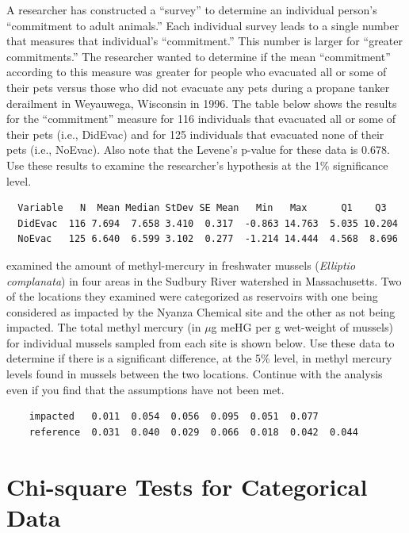 \documentclass[10pt,openany]{book}\usepackage[]{graphicx}\usepackage[]{color}
\begin{document}
\begin{hwsection}
  \item \label{hwprob:tTestCommitment} A researcher has constructed a ``survey'' to determine an individual person's ``commitment to adult animals.''  Each individual survey leads to a single number that measures that individual's ``commitment.''  This number is larger for ``greater commitments.''  The researcher wanted to determine if the mean ``commitment'' according to this measure was greater for people who evacuated all or some of their pets versus those who did not evacuate any pets during a propane tanker derailment in Weyauwega, Wisconsin in 1996.  The table below shows the results for the ``commitment'' measure for 116 individuals that evacuated all or some of their pets (i.e., DidEvac) and for 125 individuals that evacuated none of their pets (i.e., NoEvac).  Also note that the Levene's p-value for these data is 0.678.  Use these results to examine the researcher's hypothesis at the 1\% significance level.

  \begin{Verbatim}
  Variable   N  Mean Median StDev SE Mean   Min   Max      Q1    Q3
  DidEvac  116 7.694  7.658 3.410  0.317  -0.863 14.763  5.035 10.204
  NoEvac   125 6.640  6.599 3.102  0.277  -1.214 14.444  4.568  8.696
  \end{Verbatim}

  \item \label{hwprob:tTestMussels} \rhw{} \cite{MierzykowskiCarr2001} examined the amount of methyl-mercury in freshwater mussels (\emph{Elliptio complanata}) in four areas in the Sudbury River watershed in Massachusetts.  Two of the locations they examined were categorized as reservoirs with one being considered as impacted by the Nyanza Chemical site and the other as not being impacted.  The total methyl mercury (in $\mu$g meHG per g wet-weight of mussels) for individual mussels sampled from each site is shown below.  Use these data to determine if there is a significant difference, at the 5\% level, in methyl mercury levels found in mussels between the two locations.  Continue with the analysis even if you find that the assumptions have not been met.

  \begin{Verbatim}
    impacted   0.011  0.054  0.056  0.095  0.051  0.077
    reference  0.031  0.040  0.029  0.066  0.018  0.042  0.044
  \end{Verbatim}
\end{hwsection}



\chapter[Chi-square Tests]{Chi-square Tests for Categorical Data} \label{chap:ChiSquare}
\end{document}
